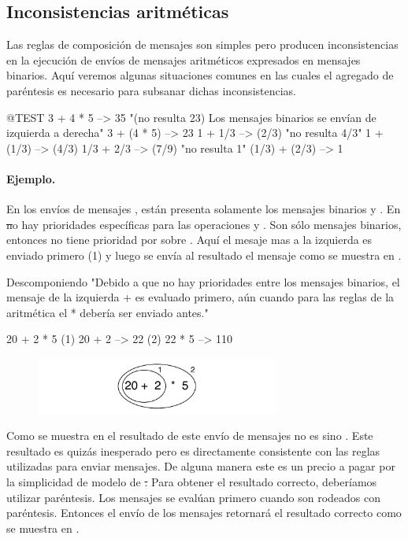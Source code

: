 \documentclass[a4paper,10pt,twoside]{book}
\begin{document}
\subsection{Inconsistencias aritméticas}
Las reglas de composición de mensajes son simples pero producen inconsistencias en la ejecución de envíos de mensajes aritméticos expresados en mensajes binarios. Aquí veremos algunas situaciones comunes en las cuales el agregado de paréntesis es necesario para subsanar dichas inconsistencias.

\begin{code}{@TEST}
3 + 4 * 5      --> 35    "(no resulta 23)  Los mensajes binarios se envían de izquierda a derecha"
3 + (4 * 5)    --> 23
1 + 1/3         --> (2/3)    "no resulta 4/3"
1 + (1/3)       --> (4/3)
1/3 + 2/3       --> (7/9)    "no resulta 1"
(1/3) + (2/3)  --> 1
\end{code}

\paragraph{Ejemplo.} 
En los envíos de mensajes , están presenta solamente los mensajes binarios \ct{+} y \ct{*}. En \st no hay prioridades específicas para las operaciones \ct{+} y \ct{*}. Son sólo mensajes binarios, entonces \ct{*} no tiene prioridad por sobre \ct{+}. Aquí el mesaje mas a la izquierda \ct{+} es enviado primero (1) y luego se envía al resultado el mensaje \ct{*} como se muestra en .

\begin{example}[binaryMessages1]{Descomponiendo }{}
"Debido a que no hay prioridades entre los mensajes binarios, el mensaje de la izquierda + es evaluado primero, aún cuando para las reglas de la aritmética el * debería ser enviado antes."

      20 + 2 * 5 
(1)  20 + 2 --> 22
(2)  22       * 5 --> 110
\end{example}

\begin{figure}
\begin{center}\includegraphics[width=8cm]{ucompoNoBracketPar}\end{center}
\end{figure}
\noindent
Como se muestra en  el resultado de este envío de mensajes no es  sino . Este resultado es quizás inesperado pero es directamente consistente con las reglas utilizadas para enviar mensajes. De alguna manera este es un precio a pagar por la simplicidad de modelo de \st. Para obtener el resultado correcto, deberíamos utilizar paréntesis. Los mensajes se evalúan primero cuando son rodeados con paréntesis. Entonces el envío de los mensajes  retornará el resultado correcto como se muestra en .
\end{document}
